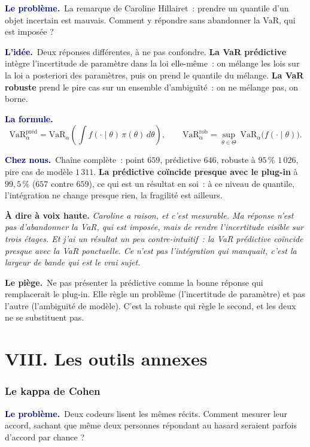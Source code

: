 \documentclass[11pt,a4paper]{article}
\newcommand{\lequoi}[1]{\smallskip\noindent\textcolor{navy}{\textbf{Le problème.}}\ #1\par}
\newcommand{\lidee}[1]{\smallskip\noindent\textcolor{navy}{\textbf{L'idée.}}\ #1\par}
\newcommand{\laformule}[1]{\smallskip\noindent\textcolor{navy}{\textbf{La formule.}}\ #1\par}
\newcommand{\cheznous}[1]{\smallskip\noindent\textcolor{navy}{\textbf{Chez nous.}}\ #1\par}
\newcommand{\lepiege}[1]{\smallskip\noindent\textcolor{accent}{\textbf{Le piège.}}\ #1\par}
\newcommand{\laphrase}[1]{\begin{phrasebox}\textbf{À dire à voix haute.} \emph{#1}\end{phrasebox}}
\begin{document}
\lequoi{La remarque de Caroline Hillairet~: prendre un quantile d'un objet incertain est
mauvais. Comment y répondre sans abandonner la VaR, qui est imposée ?}

\lidee{Deux réponses différentes, à ne pas confondre.
\textbf{La VaR prédictive} intègre l'incertitude de paramètre dans la loi elle-même~: on
mélange les lois sur la loi a posteriori des paramètres, puis on prend le quantile du
mélange.
\textbf{La VaR robuste} prend le pire cas sur un ensemble d'ambiguïté~: on ne mélange pas,
on borne.}

\laformule{
\[
  \mathrm{VaR}^{\text{préd}}_\alpha = \mathrm{VaR}_\alpha\!
  \left(\int f(\cdot\mid\theta)\,\pi(\theta)\,d\theta\right),
  \qquad
  \mathrm{VaR}^{\text{rob}}_\alpha = \sup_{\theta\in\Theta}\ \mathrm{VaR}_\alpha
  \bigl(f(\cdot\mid\theta)\bigr).
\]}

\cheznous{Chaîne complète~: point $659$, prédictive $646$, robuste à $95\,\%$ $1\,026$,
pire cas de modèle $1\,311$. \textbf{La prédictive coïncide presque avec le plug-in} à
$99{,}5\,\%$ ($657$ contre $659$), ce qui est un résultat en soi~: à ce niveau de quantile,
l'intégration ne change presque rien, la fragilité est ailleurs.}

\laphrase{Caroline a raison, et c'est mesurable. Ma réponse n'est pas d'abandonner la VaR,
qui est imposée, mais de rendre l'incertitude visible sur trois étages. Et j'ai un résultat
un peu contre-intuitif~: la VaR prédictive coïncide presque avec la VaR ponctuelle. Ce n'est
pas l'intégration qui manquait, c'est la largeur de bande qui est le vrai sujet.}

\lepiege{Ne pas présenter la prédictive comme \og la bonne réponse\fg{} qui remplacerait le
plug-in. Elle règle un problème (l'incertitude de paramètre) et pas l'autre (l'ambiguïté de
modèle). C'est la robuste qui règle le second, et les deux ne se substituent pas.}

\part*{VIII. Les outils annexes}

\section{Le kappa de Cohen}

\lequoi{Deux codeurs lisent les mêmes récits. Comment mesurer leur accord, sachant que même
deux personnes répondant au hasard seraient parfois d'accord par chance ?}
\end{document}

